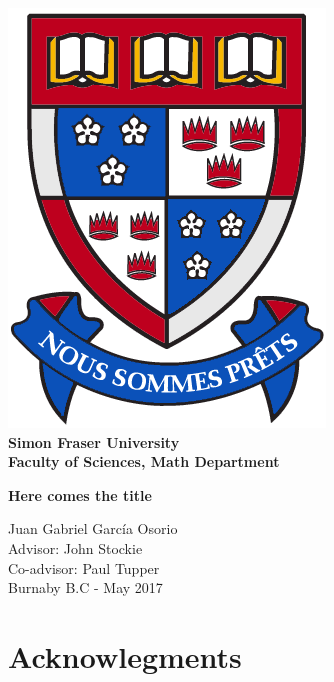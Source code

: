 \documentclass[12pt]{book}
\begin{document}
\setlength{\unitlength}{1 cm} %
\thispagestyle{empty}
\begin{center}
    \includegraphics[scale=0.5]{log.png} \\[1cm]
\textbf{{\LARGE Simon Fraser University}\\[0.5cm]
{\LARGE Faculty of Sciences, Math Department}}\\[1.25cm]
\begin{doublespace}
{\huge \textbf{Here comes the title}}\\[1.5cm]
\end{doublespace}
{\large Juan Gabriel Garc{\'i}a Osorio}\\[1cm]
Advisor: John Stockie\\[1cm]
Co-advisor: Paul Tupper\\[1cm]
Burnaby B.C - May  2017
\end{center}

\newpage
\tableofcontents


\chapter*{Acknowlegments}

\newpage


\end{document}
